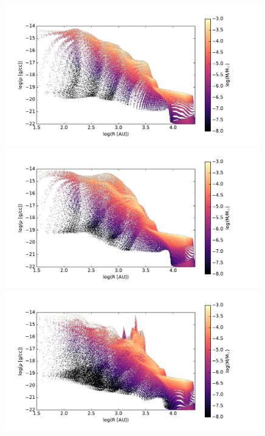 
\begin{figure}[!htb]
 \centering
 \includegraphics[width=0.99\textwidth]{Figures/var_rt_larson_plots/rho_R_hist_n100c01}
 \includegraphics[width=0.99\textwidth]{Figures/var_rt_larson_plots/rho_R_hist_n10c01}
 \includegraphics[width=0.99\textwidth]{Figures/var_rt_larson_plots/rho_R_hist_n1c01}

\end{figure}
